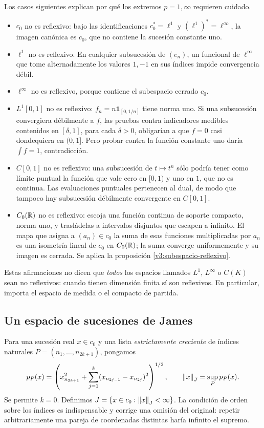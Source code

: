 Los casos siguientes explican por qué los extremos $p=1,\infty$ requieren cuidado.
\begin{itemize}
\item $c_0$ no es reflexivo: bajo las identificaciones $c_0^*=\ell^1$ y $(\ell^1)^*=\ell^\infty$, la imagen canónica es $c_0$, que no contiene la sucesión constante uno.
\item $\ell^1$ no es reflexivo. En cualquier subsucesión de $(e_n)$, un funcional de $\ell^\infty$ que tome alternadamente los valores $1,-1$ en sus índices impide convergencia débil.
\item $\ell^\infty$ no es reflexivo, porque contiene el subespacio cerrado $c_0$.
\item $L^1[0,1]$ no es reflexivo: $f_n=n\mathbf1_{[0,1/n]}$ tiene norma uno. Si una subsucesión convergiera débilmente a $f$, las pruebas contra indicadores medibles contenidos en $[\delta,1]$, para cada $\delta>0$, obligarían a que $f=0$ casi dondequiera en $(0,1]$. Pero probar contra la función constante uno daría $\int f=1$, contradicción.
\item $C[0,1]$ no es reflexivo: una subsucesión de $t\mapsto t^n$ sólo podría tener como límite puntual la función que vale cero en $[0,1)$ y uno en $1$, que no es continua. Las evaluaciones puntuales pertenecen al dual, de modo que tampoco hay subsucesión débilmente convergente en $C[0,1]$.
\item $C_0(\mathbb R)$ no es reflexivo: escoja una función continua de soporte compacto, norma uno, y trasládelas a intervalos disjuntos que escapen a infinito. El mapa que asigna a $(a_n)\in c_0$ la suma de esas funciones multiplicadas por $a_n$ es una isometría lineal de $c_0$ en $C_0(\mathbb R)$; la suma converge uniformemente y su imagen es cerrada. Se aplica la proposición \ref{v3:subespacio-reflexivo}.
\end{itemize}
Estas afirmaciones no dicen que \emph{todos} los espacios llamados $L^1$, $L^\infty$ o $C(K)$ sean no reflexivos: cuando tienen dimensión finita sí son reflexivos. En particular, importa el espacio de medida o el compacto de partida.

\subsection{Un espacio de sucesiones de James}
Para una sucesión real $x\in c_0$ y una lista \emph{estrictamente creciente} de índices naturales $P=(n_1,\ldots,n_{2k+1})$, pongamos
\[
 p_P(x)=\left(x_{n_{2k+1}}^2+
       \sum_{j=1}^k(x_{n_{2j-1}}-x_{n_{2j}})^2\right)^{1/2},
 \qquad \left\lVert x\right\rVert_J=\sup_P p_P(x).
\]
Se permite $k=0$. Definimos $J=\{x\in c_0:\left\lVert x\right\rVert_J<\infty\}$. La condición de orden sobre los índices es indispensable y corrige una omisión del original: repetir arbitrariamente una pareja de coordenadas distintas haría infinito el supremo.

